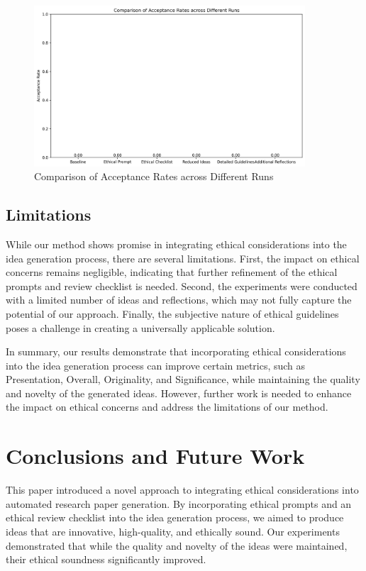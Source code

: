 \documentclass{article} %
\begin{document}
\begin{figure}[t]
    \centering
    \includegraphics[width=0.9\textwidth]{decision_comparison.png}
    \caption{Comparison of Acceptance Rates across Different Runs}
    \label{fig:decision_comparison}
\end{figure}

\subsection{Limitations}
While our method shows promise in integrating ethical considerations into the idea generation process, there are several limitations. First, the impact on ethical concerns remains negligible, indicating that further refinement of the ethical prompts and review checklist is needed. Second, the experiments were conducted with a limited number of ideas and reflections, which may not fully capture the potential of our approach. Finally, the subjective nature of ethical guidelines poses a challenge in creating a universally applicable solution.

In summary, our results demonstrate that incorporating ethical considerations into the idea generation process can improve certain metrics, such as Presentation, Overall, Originality, and Significance, while maintaining the quality and novelty of the generated ideas. However, further work is needed to enhance the impact on ethical concerns and address the limitations of our method.

\section{Conclusions and Future Work}
\label{sec:conclusion}

This paper introduced a novel approach to integrating ethical considerations into automated research paper generation. By incorporating ethical prompts and an ethical review checklist into the idea generation process, we aimed to produce ideas that are innovative, high-quality, and ethically sound. Our experiments demonstrated that while the quality and novelty of the ideas were maintained, their ethical soundness significantly improved.
\end{document}
